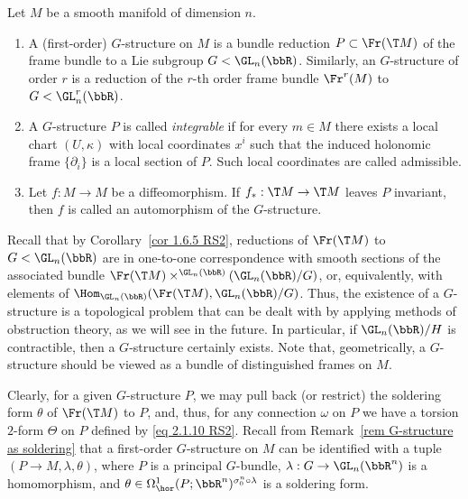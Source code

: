 \begin{defn}
    Let $M$ be a smooth manifold of dimension $n$.
    \begin{enumerate}
        \item A (first-order) $G$-structure on $M$ is a bundle reduction $P\subset \Fr(\T M)$ of the frame bundle to a Lie subgroup $G< \GL_n(\bbR)$. Similarly, an $G$-structure of order $r$ is a reduction of the $r$-th order frame bundle $\Fr^r(M)$ to $G<\GL_n^r(\bbR)$.
        \item A $G$-structure $P$ is called \emph{integrable} if for every $m\in M$ there exists a local chart $(U,\kappa)$ with local coordinates $x^i$ such that the induced holonomic frame $\{\partial_i\}$ is a local section of $P$. Such local coordinates are called admissible.
        \item Let $f:M\to M$ be a diffeomorphism. If $f_\ast:\T M\to \T M$ leaves $P$ invariant, then $f$ is called an automorphism of the $G$-structure.
    \end{enumerate}
\end{defn}

Recall that by Corollary~\ref{cor 1.6.5 RS2}, reductions of $\Fr(\T M)$ to $G<\GL_n(\bbR)$ are in one-to-one correspondence with smooth sections of the associated bundle $\Fr(\T M)\times^{\GL_n(\bbR)}(\GL_n(\bbR)\slash G)$, or, equivalently, with elements of $\Hom_{\GL_n(\bbR)}(\Fr(\T M),\GL_n(\bbR)\slash G)$. Thus, the existence of a $G$-structure is a topological problem that can be dealt with by applying methods of obstruction theory, as we will see in the future. In particular, if $\GL_n(\bbR)\slash H$ is contractible, then a $G$-structure certainly exists. Note that, geometrically, a $G$-structure should be viewed as a bundle of distinguished frames on $M$.

\begin{rem}
    Clearly, for a given $G$-structure $P$, we may pull back (or restrict) the soldering form $\theta$ of $\Fr(\T M)$ to $P$, and, thus, for any connection $\omega$ on $P$ we have a torsion $2$-form $\Theta$ on $P$ defined by \eqref{eq 2.1.10 RS2}. Recall from Remark~\ref{rem G-structure as soldering} that a first-order $G$-structure on $M$ can be identified with a tuple $(P\to M,\lambda,\theta)$, where $P$ is a principal $G$-bundle, $\lambda:G\to \GL_n(\bbR^n)$ is a homomorphism, and $\theta\in \Omega^1_{\hor}(P;\bbR^n)^{\sigma_0^n\circ\lambda}$ is a soldering form.
\end{rem}


